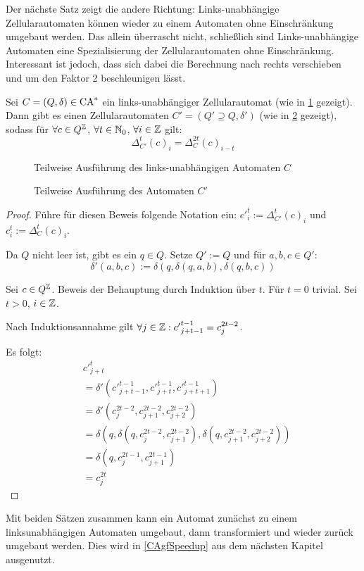 Der nächste Satz zeigt die andere Richtung: Links-unabhängige Zellularautomaten können
wieder zu einem Automaten ohne Einschränkung umgebaut werden. Das allein überrascht nicht, schließlich
sind Links-unabhängige Automaten eine Spezialisierung der Zellularautomaten ohne Einschränkung.
Interessant ist jedoch, dass sich dabei die Berechnung nach rechts verschieben und um den Faktor 2 beschleunigen lässt.
\begin{satz}
    \label{linksunabhaengigZuZellauto}
    Sei $C = (Q, \delta) \in \textrm{CA}^*$ ein links-unabhängiger Zellularautomat (wie in \cref{fig:LinksunabhZuNormal1} gezeigt).
    Dann gibt es einen Zellularautomaten $C' = (Q' \supseteq Q, \delta')$ (wie in \cref{fig:LinksunabhZuNormal2} gezeigt),
    sodass für $\forall c \in Q^{\mathbb{Z}}$, $\forall t \in \mathbb{N}_0$, $\forall i \in \mathbb{Z}$ gilt:
    \[
        \Delta^t_{C'}(c)_{i} = \Delta^{2t}_C(c)_{i-t}
    \]
    
    \begin{figure}[h!]
        \centering
        
        \caption{Teilweise Ausführung des links-unabhängigen Automaten $C$}
        \label{fig:LinksunabhZuNormal1}
    \end{figure}
   \begin{figure}[h!]
        \centering
        
        \caption{Teilweise Ausführung des Automaten $C'$}
        \label{fig:LinksunabhZuNormal2}
    \end{figure}

\end{satz}
\begin{proof}
    Führe für diesen Beweis folgende Notation ein: ${c'}^{t}_i := \Delta^{t}_{C'}(c)_i$ und $c^t_i := \Delta^{t}_{C}(c)_i$.
    
    Da $Q$ nicht leer ist, gibt es ein $q \in Q$.
    Setze $Q' := Q$ und für $a, b, c \in Q'$:
    \[
        \delta'(a, b, c) := \delta(q, \delta(q, a, b), \delta(q, b, c))
    \]
    
    Sei $c \in Q^{\mathbb{Z}}$. Beweis der Behauptung durch Induktion über $t$. Für $t = 0$ trivial. Sei $t > 0$, $i \in \mathbb{Z}$.

    Nach Induktionsannahme gilt $\forall j \in \mathbb{Z}: {c'}^{t-1}_{j+t-1} = c^{2t-2}_j$.
    
    Es folgt:
    \begin{align*}
        & {c'}^{t}_{j+t} \\
        &= \delta'({c'}^{t-1}_{j+t-1}, {c'}^{t-1}_{j+t}, {c'}^{t-1}_{j+t+1}) \\
        &= \delta'(c^{2t-2}_{j}, c^{2t-2}_{j+1}, c^{2t-2}_{j+2}) \\
        &= \delta(q, \delta(q, c^{2t-2}_{j}, c^{2t-2}_{j+1}), \delta(q, c^{2t-2}_{j+1}, c^{2t-2}_{j+2})) \\
        &= \delta(q, c^{2t-1}_j, c^{2t-1}_{j+1} ) \\
        &= c^{2t}_j 
    \end{align*}
\end{proof}

Mit beiden Sätzen zusammen kann ein Automat zunächst zu einem linksunabhängigen Automaten umgebaut,
dann transformiert und wieder zurück umgebaut werden. Dies wird in \cref{CAgfSpeedup} aus dem nächsten Kapitel ausgenutzt.